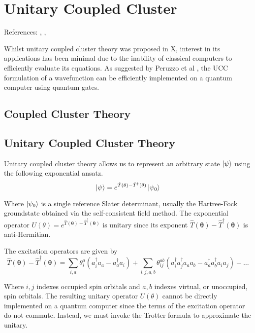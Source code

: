 \section{Unitary Coupled Cluster}
References: \cite{Anand2021}, \cite{McClean2016}, \cite{Chan2021}

Whilst unitary coupled cluster theory was proposed in X, interest in its applications has been minimal due to the inability of classical computers to efficiently evaluate its equations. As suggested by Peruzzo et al \cite{Peruzzo2014}, the UCC formulation of a wavefunction can be efficiently implemented on a quantum computer using quantum gates.

\subsection{Coupled Cluster Theory}

\subsection{Unitary Coupled Cluster Theory}

Unitary coupled cluster theory allows us to represent an arbitrary state $\ket\psi$ using the following exponential ansatz.
\begin{equation*}
    \ket\psi = e^{\hat T(\mathbf{\theta}) - \hat T^\dagger(\mathbf{\theta})} \ket{\psi_0}
\end{equation*}

Where $\ket{\psi_0}$ is a single reference Slater determinant, usually the Hartree-Fock groundstate obtained via the self-consistent field method. The exponential operator $U(\theta) = e^{\hat T(\mathbf{\theta}) - \hat T^\dagger(\mathbf{\theta})}$ is unitary since its exponent $\hat T(\mathbf{\theta}) - \hat T^\dagger(\mathbf{\theta})$ is anti-Hermitian.

The excitation operators are given by
\begin{equation*}
\hat T(\mathbf{\theta}) - \hat T^{\dagger}(\mathbf{\theta}) =
\sum_{i, a} \theta^a_i (a^\dagger_i a_a - a^\dagger_a a_i) + 
\sum_{i, j, a, b} \theta^{ab}_{ij} (a^\dagger_i a^\dagger_j a_a a_b - a^\dagger_a a^\dagger_b a_i a_j) + \dots
\end{equation*}

Where $i, j$ indexes occupied spin orbitals and $a, b$ indexes virtual, or unoccupied, spin orbitals. The resulting unitary operator $U(\theta)$ cannot be directly implemented on a quantum computer since the terms of the excitation operator do not commute. Instead, we must invoke the Trotter formula to approximate the unitary.

